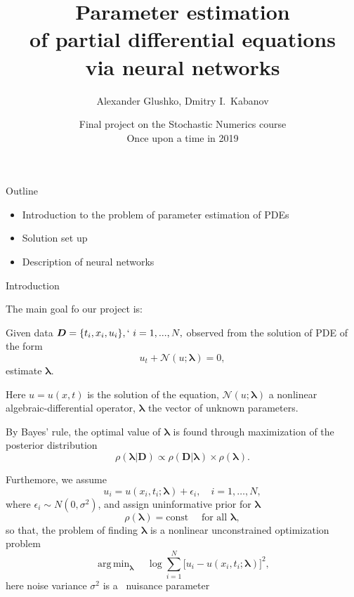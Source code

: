\documentclass{beamer}
\title{\vspace{-0.5cm}Parameter estimation\\of partial differential equations\\via neural networks}
\author{Alexander Glushko, Dmitry I.\ Kabanov}
\date{Final project on the Stochastic Numerics course\\Once upon a time in 2019}
\newcommand{\Data}{\vec{D}}
\renewcommand{\vec}[1]{\boldsymbol{#1}}
\newcommand{\VLambda}{\ensuremath{\vec{\lambda}}}
\DeclareMathOperator*{\argmin}{arg\,min}
\newcommand{\NonlinOp}{\mathcal N\!}
\begin{document}
\maketitle

\begin{frame}{Outline}
\begin{itemize}
    \item Introduction to the problem of parameter estimation of PDEs
    \item Solution set up
    \item Description of neural networks
\end{itemize}
\end{frame}


\begin{frame}{Introduction}

The main goal fo our project is:

Given data $\vec{D} = \{t_i, x_i, u_i\},`~i = 1, ..., N,$ observed from the solution of PDE of the form
\begin{equation}
    \label{eq:pde}
    u_t + \mathcal N\!(u; \VLambda) = 0,
\end{equation}
estimate $\VLambda$.

Here $u=u(x, t)$ is the solution of the equation,
$\NonlinOp(u; \VLambda)$ a nonlinear algebraic-differential operator,
$\VLambda$ the vector of unknown parameters.

\end{frame}

\begin{frame}

By Bayes' rule, the optimal value of $\VLambda$ is found through
maximization of the posterior distribution \cite{sivia2006data}
\begin{equation}
    \rho( \VLambda | \Data ) \propto
    \rho( \Data | \VLambda ) \times \rho( \VLambda ).
\end{equation}

Furthemore, we assume
\begin{equation}
    u_i = u(x_i, t_i; \VLambda) + \epsilon_i, \quad i=1, \dots, N,
\end{equation}
where $\epsilon_i \sim N(0, \sigma^2)$, and assign uninformative prior for $\VLambda$
\begin{equation}
    \rho(\vec{\lambda}) = \text{const} \quad \text{ for all } \vec{\lambda},
\end{equation}
so that, the problem of finding $\VLambda$ is a nonlinear unconstrained
optimization problem
\begin{equation}
    \label{eq:optim-ideal}
    \argmin_{\VLambda} \quad 
    \log \sum_{i=1}^{N} \big[ u_i - u(x_i, t_i; \VLambda) \big]^2,
\end{equation}
here noise variance $\sigma^2$ is a~
nuisance parameter~\cite[section~8.2]{sivia2006data}
    
\end{frame}
\end{document}
